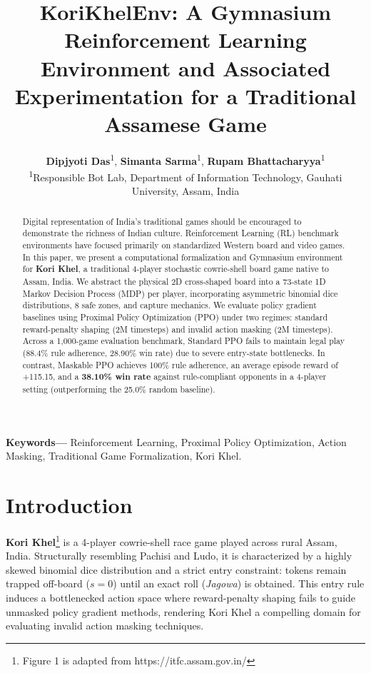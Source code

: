 \documentclass[10pt,twocolumn,a4paper]{article}
\title{\vspace{-1.2em}\textbf{\Large %
KoriKhelEnv: A Gymnasium Reinforcement Learning Environment and Associated Experimentation for a Traditional Assamese Game}\vspace{-0.4em}}
\author{
    \textbf{Dipjyoti Das}\textsuperscript{1}, \textbf{Simanta Sarma}\textsuperscript{1}, \textbf{Rupam Bhattacharyya}\textsuperscript{1} \\
    \textsuperscript{1}Responsible Bot Lab, Department of Information Technology, Gauhati University, Assam, India
}
\date{\vspace{-2.0em}}
\begin{document}
\maketitle

\begin{abstract}
Digital representation of India’s traditional games should be encouraged to demonstrate the richness of Indian culture. Reinforcement Learning (RL) benchmark environments have focused primarily on standardized Western board and video games. %
In this paper, we present a computational formalization and Gymnasium environment for \textbf{Kori Khel}, a traditional 4-player stochastic cowrie-shell board game native to Assam, India. We abstract the physical 2D cross-shaped board into a 73-state 1D Markov Decision Process (MDP) per player, incorporating asymmetric binomial dice distributions, 8 safe zones, and capture mechanics. We evaluate policy gradient baselines using Proximal Policy Optimization (PPO) under two regimes: standard reward-penalty shaping (2M timesteps) and invalid action masking (2M timesteps). Across a 1,000-game evaluation benchmark, Standard PPO fails to maintain legal play (88.4\% rule adherence, 28.90\% win rate) due to severe entry-state bottlenecks. In contrast, Maskable PPO achieves 100\% rule adherence, an average episode reward of +115.15, and a \textbf{38.10\% win rate} against rule-compliant opponents in a 4-player setting (outperforming the 25.0\% random baseline). %
\end{abstract}

\textbf{\small Keywords---} Reinforcement Learning, Proximal Policy Optimization, Action Masking, Traditional Game Formalization, Kori Khel.

\section{Introduction}
\textbf{Kori Khel}\footnote{Figure 1 is adapted from https://itfc.assam.gov.in/} is a 4-player cowrie-shell race game played across rural Assam, India. Structurally resembling Pachisi and Ludo, it is characterized by a highly skewed binomial dice distribution and a strict entry constraint: tokens remain trapped off-board ($s=0$) until an exact roll (\textit{Jagowa}) is obtained. This entry rule induces a bottlenecked action space where reward-penalty shaping fails to guide unmasked policy gradient methods, rendering Kori Khel a compelling domain for evaluating invalid action masking techniques.
\end{document}
